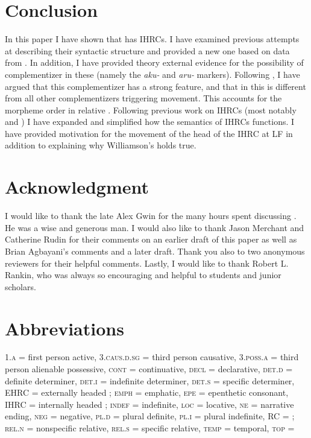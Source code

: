 \documentclass[output=paper]{LSP/langsci}
\begin{document}
\section{Conclusion}\label{sec:boyle:7}

In this paper I have shown that  has IHRCs. I have examined previous attempts at describing their syntactic structure and provided a new one based on data from . In addition, I have provided theory external evidence for the possibility of complementizer in these  (namely the \textit{aku-} and \textit{aru-} markers). Following \citet{Culy1990}, I have argued that this complementizer has a strong feature, and that in  this is different from all other complementizers triggering movement. This accounts for the morpheme order in  relative .  Following previous work on IHRCs (most notably \citealt{Williamson1987} and \citealt{Culy1990}) I have expanded and simplified how the semantics of IHRCs functions. I have provided motivation for the movement of the head of the IHRC at LF in addition to explaining why Williamson's  holds true.

\section*{Acknowledgment}

I would like to thank the late Alex Gwin for the many hours spent discussing . He was a wise and generous man. I would also like to thank Jason Merchant and Catherine Rudin for their comments on an earlier draft of this paper as well as Brian Agbayani's comments and a later draft. Thank you also to two anonymous reviewers for their helpful comments. Lastly, I would like to thank Robert L. Rankin, who was always so encouraging and helpful to students and junior scholars.

\section*{Abbreviations}

\textsc{1.a} = first person active, \textsc{3.caus.d.sg} = third person causative, \textsc{3.poss.a} = third person alienable possessive, \textsc{cont} = continuative, \textsc{decl} = declarative, \textsc{det.d} = definite determiner, \textsc{det.i} = indefinite determiner, \textsc{det.s} = specific determiner, EHRC = externally headed ; \textsc{emph} = emphatic, \textsc{epe} = epenthetic consonant, IHRC = internally headed ; \textsc{indef} = indefinite, \textsc{loc} = locative, \textsc{ne} = narrative ending, \textsc{neg} = negative, \textsc{pl.d} = plural definite, \textsc{pl.i} = plural indefinite, RC = ; \textsc{rel.n} = nonspecific relative, \textsc{rel.s} = specific relative, \textsc{temp} = temporal, \textsc{top} = 

\printbibliography[heading=subbibliography,notkeyword=this]
\end{document}
